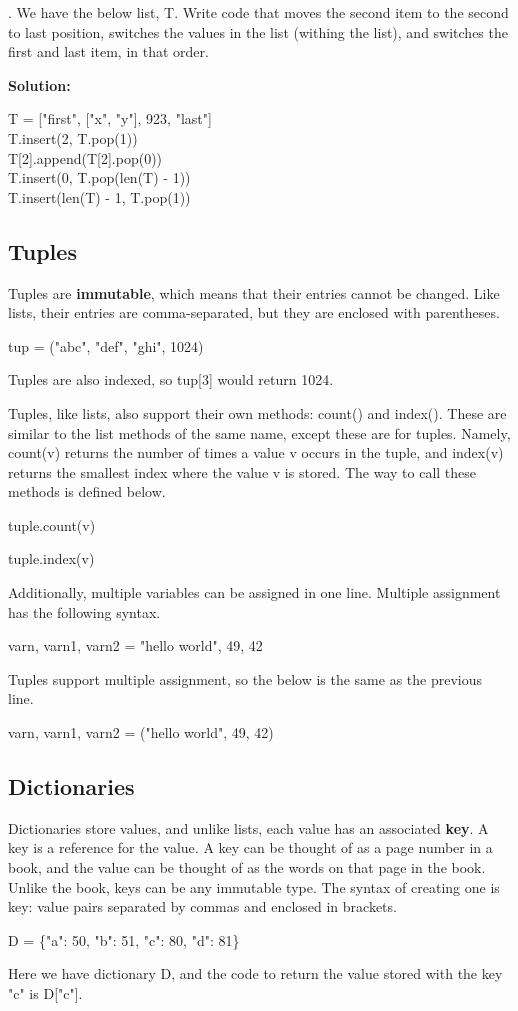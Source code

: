 \documentclass{article}
\newcommand{\define}[1]{\begin{center}\ttfamily #1\end{center}}
\newcommand{\icode}[1]{{\ttfamily #1}}
\newenvironment{code}{\begin{tcolorbox}\ttfamily}{\end{tcolorbox}}
\begin{document}
. We have the below list, \icode{T}. Write code that moves the second item to the second to last position, switches the values in the list (withing the list), and switches the first and last item, in that order.

\noindent\textbf{Solution:}
\begin{code}
T = ["first", ["x", "y"], 923, "last"]\\
T.insert(2, T.pop(1))\\
T[2].append(T[2].pop(0))\\
T.insert(0, T.pop(len(T) - 1))\\
T.insert(len(T) - 1, T.pop(1))
\end{code}

\subsection{Tuples}
Tuples are \textbf{immutable}, which means that their entries cannot be changed. Like lists, their entries are comma-separated, but they are enclosed with parentheses.
\define{tup = ("abc", "def", "ghi", 1024)}
Tuples are also indexed, so {\ttfamily tup[3]} would return 1024.

Tuples, like lists, also support their own methods: {\ttfamily count()} and {\ttfamily index()}. These are similar to the list methods of the same name, except these are for tuples. Namely, {\ttfamily count(v)} returns the number of times a value {\ttfamily v} occurs in the tuple, and {\ttfamily index(v)} returns the smallest index where the value {\ttfamily v} is stored. The way to call these methods is defined below.
\define{tuple.count(v)}
\define{tuple.index(v)}
Additionally, multiple variables can be assigned in one line. Multiple assignment has the following syntax.
\define{varn, varn1, varn2 = "hello world", 49, 42}
Tuples support multiple assignment, so the below is the same as the previous line.
\define{varn, varn1, varn2 = ("hello world", 49, 42)}
\subsection{Dictionaries}
Dictionaries store values, and unlike lists, each value has an associated \textbf{key}. A key is a reference for the value. A key can be thought of as a page number in a book, and the value can be thought of as the words on that page in the book. Unlike the book, keys can be any immutable type. The syntax of creating one is {\ttfamily key: value} pairs separated by commas and enclosed in brackets.
\define{D = \{"a": 50, "b": 51, "c": 80, "d": 81\}}
Here we have dictionary \icode{D}, and the code to return the value stored with the key \icode{"c"} is \icode{D["c"]}.
\end{document}
